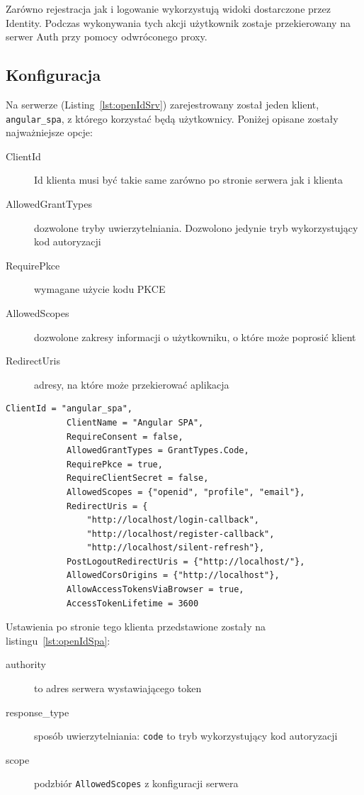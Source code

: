 	Zarówno rejestracja jak i logowanie wykorzystują widoki dostarczone przez Identity.
	Podczas wykonywania tych akcji użytkownik zostaje przekierowany na serwer Auth przy pomocy odwróconego proxy.

	\subsection{Konfiguracja}
		Na serwerze (Listing~\ref{lst:openIdSrv}) zarejestrowany został jeden klient, \verb|angular_spa|, z którego korzystać będą użytkownicy.
		Poniżej opisane zostały najważniejsze opcje:
		\begin{description}
			\item[ClientId] Id klienta musi być takie same zarówno po stronie serwera jak i klienta
			\item[AllowedGrantTypes] dozwolone tryby uwierzytelniania. Dozwolono jedynie tryb wykorzystujący kod autoryzacji
			\item[RequirePkce] wymagane użycie kodu PKCE
			\item[AllowedScopes] dozwolone zakresy informacji o użytkowniku, o które może poprosić klient
			\item[RedirectUris] adresy, na które może przekierować aplikacja
		\end{description}
		\begin{lstlisting}[label=lst:openIdSrv, caption=Konfiguracja OpenId po stronie serwera, float=h]
			ClientId = "angular_spa",
			ClientName = "Angular SPA",
			RequireConsent = false,
			AllowedGrantTypes = GrantTypes.Code,
			RequirePkce = true,
			RequireClientSecret = false,
			AllowedScopes = {"openid", "profile", "email"},
			RedirectUris = {
				"http://localhost/login-callback",
				"http://localhost/register-callback",
				"http://localhost/silent-refresh"},
			PostLogoutRedirectUris = {"http://localhost/"},
			AllowedCorsOrigins = {"http://localhost"},
			AllowAccessTokensViaBrowser = true,
			AccessTokenLifetime = 3600
		\end{lstlisting}
		Ustawienia po stronie tego klienta przedstawione zostały na listingu~\ref{lst:openIdSpa}:
		\begin{description}
			\item[authority] to adres serwera wystawiającego token
			\item[response\_type] sposób uwierzytelniania: \verb|code| to tryb wykorzystujący kod autoryzacji
			\item[scope] podzbiór \verb|AllowedScopes| z konfiguracji serwera
		\end{description}

